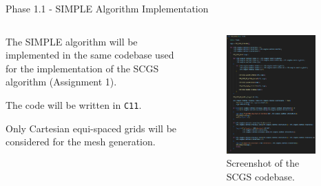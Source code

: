 \begin{frame}{Phase 1.1 - SIMPLE Algorithm Implementation}

    \begin{columns}[c, onlytextwidth]

        \begin{column}{0.5\textwidth}

            The SIMPLE algorithm will be implemented in the same codebase used for the implementation of the SCGS algorithm (Assignment 1).

            \vspace{9pt}

            The code will be written in \texttt{C11}.

            \vspace{9pt}

            Only Cartesian equi-spaced grids will be considered for the mesh generation.

        \end{column}

        \begin{column}{0.5\textwidth}

            \begin{figure}
                \centering
                \includegraphics[width=0.9\textwidth]{img/SCGS-screenshot.png}
                \caption{Screenshot of the SCGS codebase.}
            \end{figure}

        \end{column}

    \end{columns}

\end{frame}



